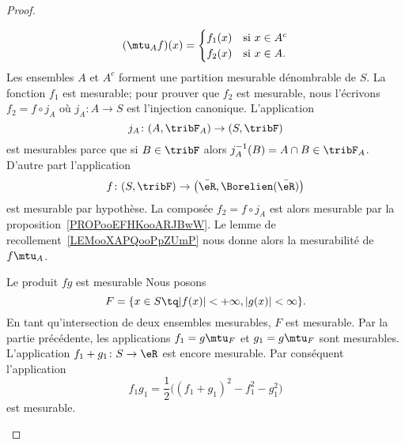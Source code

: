 \begin{proof}
\begin{subproof}
\begin{subproof}
\begin{equation}
                (\mtu_Af)(x)=\begin{cases}
                    f_1(x)    &   \text{si } x\in A^c\\
                    f_2(x)    &    \text{si } x\in  A.
                \end{cases}
            \end{equation}
            Les ensembles \( A\) et $A^c$ forment une partition mesurable dénombrable de \( S\). La fonction \( f_1\) est mesurable; pour prouver que \( f_2\) est mesurable, nous l'écrivons \( f_2=f\circ j_A\) où \( j_A\colon A\to S\) est l'injection canonique. L'application
            \begin{equation}
                j_A\colon (A,\tribF_A)\to (S,\tribF)
            \end{equation}
            est mesurables parce que si \( B\in\tribF\) alors \( j_A^{-1}(B)=A\cap B\in\tribF_A\). D'autre part l'application
            \begin{equation}
                f\colon (S,\tribF)\to \big( \bar \eR,\Borelien(\bar \eR) \big)
            \end{equation}
            est mesurable par hypothèse. La composée \( f_2=f\circ j_A\) est alors mesurable par la proposition~\ref{PROPooEFHKooARJBwW}. Le lemme de recollement~\ref{LEMooXAPQooPpZUmP} nous donne alors la mesurabilité de \( f\mtu_A\).

        \item[Le produit \( fg\) est mesurable]
            Nous posons
            \begin{equation}
                F=\{ x\in S\tq | f(x) |<+\infty,| g(x) |<\infty \}.
            \end{equation}
            En tant qu'intersection de deux ensembles mesurables, \( F\) est mesurable. Par la partie précédente, les applications \( f_1=g\mtu_F\) et \( g_1=g\mtu_F\) sont mesurables. L'application \( f_1+g_1\colon S\to \eR\) est encore mesurable. Par conséquent l'application
            \begin{equation}
                f_1g_1=\frac{ 1 }{2}\big( (f_1+g_1)^2-f_1^2-g_1^2 \big)
            \end{equation}
            est mesurable.


\end{subproof}
\end{subproof}
\end{proof}
